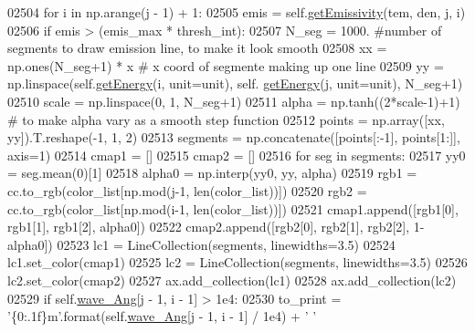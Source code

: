\begin{DoxyCode}
02504             \textcolor{keywordflow}{for} i \textcolor{keywordflow}{in} np.arange(j - 1) + 1:
02505                 emis = self.\hyperlink{classpyneb_1_1core_1_1pynebcore_1_1_atom_aaf4e84a9d5f835e6284bd9302314f775}{getEmissivity}(tem, den, j, i)
02506                 \textcolor{keywordflow}{if} emis > (emis\_max * thresh\_int):
02507                     N\_seg = 1000. \textcolor{comment}{#number of segments to draw emission line, to make it look smooth}
02508                     xx = np.ones(N\_seg+1) * x  \textcolor{comment}{# x coord of segmente making up one line}
02509                     yy = np.linspace(self.\hyperlink{classpyneb_1_1core_1_1pynebcore_1_1_atom_a9940acb2999e864edf9761d822e65d7f}{getEnergy}(i, unit=unit), self.
      \hyperlink{classpyneb_1_1core_1_1pynebcore_1_1_atom_a9940acb2999e864edf9761d822e65d7f}{getEnergy}(j, unit=unit), N\_seg+1)
02510                     scale = np.linspace(0, 1, N\_seg+1)
02511                     alpha =  np.tanh((2*scale-1)+1)  \textcolor{comment}{# to make alpha vary as a smooth step function}
02512                     points = np.array([xx, yy]).T.reshape(-1, 1, 2) 
02513                     segments = np.concatenate([points[:-1], points[1:]], axis=1) 
02514                     cmap1 = []
02515                     cmap2 = []
02516                     \textcolor{keywordflow}{for} seg \textcolor{keywordflow}{in} segments:
02517                             yy0 = seg.mean(0)[1] 
02518                             alpha0 = np.interp(yy0, yy, alpha)
02519                             rgb1 = cc.to\_rgb(color\_list[np.mod(j-1, len(color\_list))]) 
02520                             rgb2 = cc.to\_rgb(color\_list[np.mod(i-1, len(color\_list))]) 
02521                             cmap1.append([rgb1[0], rgb1[1], rgb1[2], alpha0]) 
02522                             cmap2.append([rgb2[0], rgb2[1], rgb2[2], 1-alpha0])
02523                     lc1 = LineCollection(segments, linewidths=3.5)
02524                     lc1.set\_color(cmap1) 
02525                     lc2 = LineCollection(segments, linewidths=3.5)
02526                     lc2.set\_color(cmap2) 
02527                     ax.add\_collection(lc1) 
02528                     ax.add\_collection(lc2) 
02529                     \textcolor{keywordflow}{if} self.\hyperlink{classpyneb_1_1core_1_1pynebcore_1_1_atom_a044e1349bb63766a5f3d25fbf04b5c2c}{wave\_Ang}[j - 1, i - 1] > 1e4:
02530                         to\_print = \textcolor{stringliteral}{'\{0:.1f\}m'}.format(self.\hyperlink{classpyneb_1_1core_1_1pynebcore_1_1_atom_a044e1349bb63766a5f3d25fbf04b5c2c}{wave\_Ang}[j - 1, i - 1] / 1e4) + \textcolor{stringliteral}{' '}

\end{DoxyCode}
